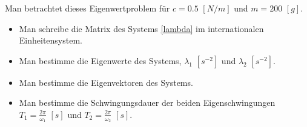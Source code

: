 {Man betrachtet dieses Eigenwertproblem für $c=0.5\,\, [N/m]$ und $m=200\,\, [g]$.
\begin{itemize}
\item Man schreibe die Matrix des Systems \eqref{lambda} im internationalen Einheitensystem.
\item Man bestimme die Eigenwerte des Systems, $\lambda_1\,\, [s^{-2}]$ und $\lambda_2\,\, [s^{-2}]$.
\item Man bestimme die Eigenvektoren des Systems.
\item Man bestimme die Schwingungsdauer der beiden Eigenschwingungen $T_1 = \frac{2\pi}{\omega_1}\,\, [s]$ und $T_2 = \frac{2\pi}{\omega_2}\,\,[s]$.
\end{itemize}
}

